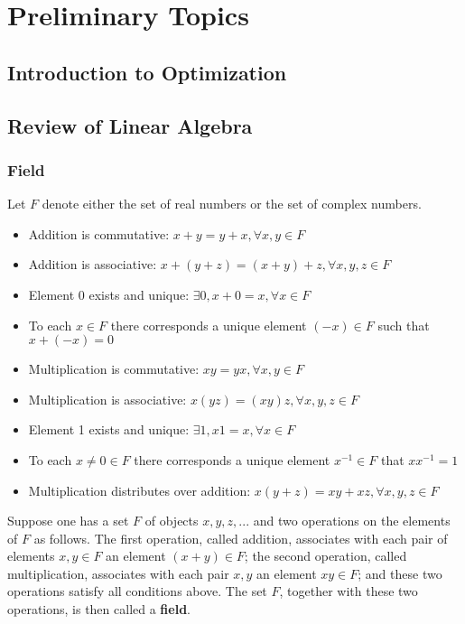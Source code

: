 \part{Preliminary Topics}
	\chapter{Introduction to Optimization}

	\chapter{Review of Linear Algebra}
		\section{Field}
			\begin{definition}[Field]
				Let $F$ denote either the set  of real numbers or the set of complex numbers.
				\begin{itemize}
					\item Addition is commutative: $x + y = y + x, \forall x, y \in F$
					\item Addition is associative: $x + (y + z) = (x + y) + z, \forall x, y, z \in F$
					\item Element 0 exists and unique: $\exists 0, x + 0 = x, \forall x \in F$
					\item To each $x \in F$ there corresponds a unique element $(-x) \in F$ such that $x + (-x) = 0$
					\item Multiplication is commutative: $xy = yx, \forall x, y \in F$
					\item Multiplication is associative: $x(yz) = (xy)z, \forall x, y, z \in F$
					\item Element 1 exists and unique: $\exists 1, x1=x, \forall x \in F$
					\item To each $x\neq 0 \in F$ there corresponds a unique element $x^{-1} \in F$ that $xx^{-1} = 1$
					\item Multiplication distributes over addition: $x(y + z) = xy + xz, \forall x, y, z \in F$
				\end{itemize}
				Suppose one has a set $F$ of objects $x, y, z, ...$ and two operations on the elements of $F$ as follows. The first operation, called addition, associates with each pair of elements $x, y \in F$ an element $(x + y)\in F$; the second operation, called multiplication, associates with each pair $x, y$ an element $xy \in F$; and these two operations satisfy all conditions above. The set $F$, together with these two operations, is then called a \textbf{field}.
			\end{definition}

